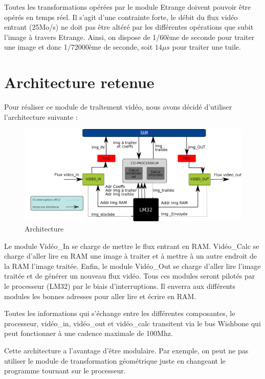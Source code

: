 \documentclass[a4paper,12pt]{report}
\begin{document}
{{Toutes les transformations opérées par le module Etrange doivent pouvoir être opérés en temps réel. Il s'agit d'une contrainte forte, le débit du flux vidéo entrant (25Mo/s) ne doit pas être altéré par les différentes opérations que subit l'image à travers Etrange.
Ainsi, on dispose de 1/60ème de seconde pour traiter une image et donc 1/72000ème de seconde, soit $14 \mu s$ pour traiter une tuile.

	\section{Architecture retenue}
{Pour réaliser ce module de traîtement vidéo, nous avons décidé d'utiliser l'architecture suivante :

\begin{figure}[!h]
	\centering
	\includegraphics[scale = 0.1]{hardware-arch.png}
	\caption{Architecture}
\end{figure}

Le module Vidéo\_In se charge de mettre le flux entrant en RAM. Vidéo\_Calc se charge d'aller lire en RAM une image à traiter et à mettre à un autre endroit de la RAM l'image traitée. Enfin, le module Vidéo\_Out se charge d'aller lire l'image traitée et de générer un nouveau flux vidéo. Tous ces modules seront pilotés par le processeur (LM32) par le biais d'interruptions. Il enverra aux différents modules les bonnes adresses pour aller lire et écrire en RAM.

Toutes les informations qui s'échange entre les différentes composantes, le processeur, vidéo\_in, vidéo\_out et vidéo\_calc transitent via le bus Wishbone qui peut fonctionner à une cadence maximale de 100Mhz.

Cette architecture a l'avantage d'être modulaire. Par exemple, on peut ne pas utiliser le module de transformation géométrique juste en changeant le programme tournant sur le processeur.
}



}}
\end{document}

